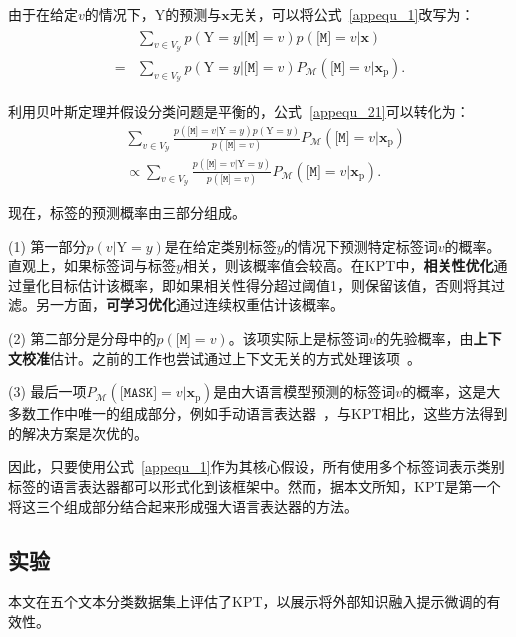 由于在给定$v$的情况下，Y的预测与$\mathbf{x}$无关，可以将公式~\eqref{appequ_1}改写为：
\begin{align}
\begin{split}
 &\sum_{v\in V_{\mathcal{Y}}} p(\text{Y}=y|\texttt{[M]}\!\!\!=\!v) p(\texttt{[M]}\!\!\!=\!v|\mathbf{x}) \\ 
 = & \sum_{v\in V_{\mathcal{Y}}}  p(\text{Y}=y|\texttt{[M]}\!\!\!=\!v) P_{\mathcal{M}}(\texttt{[M]}\!\!\!=\!v|\mathbf{x}_{\text{p}}).
 \end{split}
\label{appequ_21}
\end{align}

利用贝叶斯定理并假设分类问题是平衡的，公式~\eqref{appequ_21}可以转化为：
\begin{align}\label{appequ_2}
 &\sum_{v\in V_{\mathcal{Y}}} \frac{p(\texttt{[M]}\!\!\!=\!v|\text{Y}=y)p(\text{Y}=y) }{p(\texttt{[M]}\!\!\!=\!v)} P_{\mathcal{M}}(\texttt{[M]}\!\!\!=\!v|\mathbf{x}_{\text{p}})\nonumber\\
 &\propto \!\! \sum_{v\in V_{\mathcal{Y}}}\! \frac{p(\texttt{[M]}\!\!\!=\!v|\text{Y}=y)}{p(\texttt{[M]}\!\!\!=\!v)} P_{\mathcal{M}}(\texttt{[M]}\!\!\!=\!v|\mathbf{x}_{\text{p}}). 
\end{align}

现在，标签的预测概率由三部分组成。

(1) 第一部分$p(v|\text{Y}=y)$是在给定类别标签$y$的情况下预测特定标签词$v$的概率。直观上，如果标签词与标签$y$相关，则该概率值会较高。在KPT中，\textbf{相关性优化}通过量化目标估计该概率，即如果相关性得分超过阈值1，则保留该值，否则将其过滤。另一方面，\textbf{可学习优化}通过连续权重估计该概率。

(2) 第二部分是分母中的$p(\texttt{[M]}\!\!\!=\!v)$。该项实际上是标签词$v$的先验概率，由\textbf{上下文校准}估计。之前的工作也尝试通过上下文无关的方式处理该项~\cite{holtzman2021surface, pmlr-v139-zhao21c}。

(3) 最后一项$P_{\mathcal{M}}(\texttt{[MASK]}\!\!\!=\!v|\mathbf{x}_{\text{p}})$是由大语言模型预测的标签词$v$的概率，这是大多数工作中唯一的组成部分，例如手动语言表达器~\cite{schick2020exploiting}，与KPT相比，这些方法得到的解决方案是次优的。

因此，只要使用公式~\eqref{appequ_1}作为其核心假设，所有使用多个标签词表示类别标签的语言表达器都可以形式化到该框架中。然而，据本文所知，KPT是第一个将这三个组成部分结合起来形成强大语言表达器的方法。



\subsection{实验}
本文在五个文本分类数据集上评估了KPT，以展示将外部知识融入提示微调的有效性。

